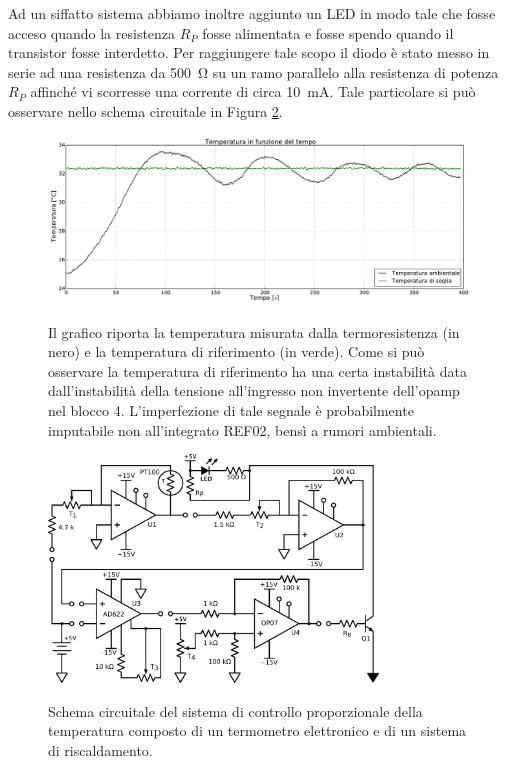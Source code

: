 Ad un siffatto sistema abbiamo inoltre aggiunto un LED in modo tale che fosse acceso quando la resistenza $R_P$ fosse alimentata e fosse spendo quando il transistor fosse interdetto.
Per raggiungere tale scopo il diodo è stato messo in serie ad una resistenza da \SI{500}{\ohm} su un ramo parallelo alla resistenza di potenza $R_P$ affinché vi scorresse una corrente di circa \SI{10}{\mA}.
Tale particolare si può osservare nello schema circuitale in Figura \ref{gr6:proporzionale}.

\begin{figure}[ht]
 \centering
   {\includegraphics[width=1\textwidth]{../E06/latex/grafico.pdf}}
 \caption{Il grafico riporta la temperatura misurata dalla termoresistenza (in nero) e la temperatura di riferimento (in verde). Come si può osservare la temperatura di riferimento ha una certa instabilità data dall'instabilità della tensione all'ingresso non invertente dell'opamp nel blocco 4. L'imperfezione di tale segnale è probabilmente imputabile non all'integrato REF02, bensì a rumori ambientali.}
 \label{gr6:grafico}
\end{figure}

\begin{figure}[htc!]
 \centering
   {\includegraphics[width=0.78\textwidth]{../E06/latex/c2.pdf}}%
 \caption{Schema circuitale del sistema di controllo proporzionale della temperatura composto di un termometro elettronico e di un sistema di riscaldamento.}
 \label{gr6:proporzionale}
\end{figure}

